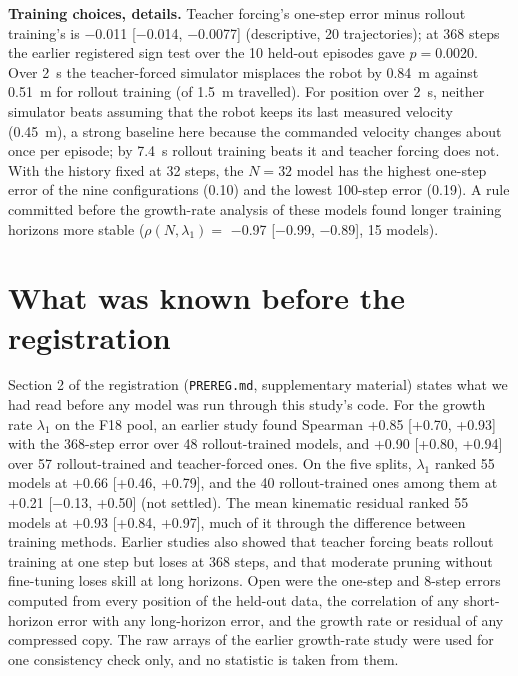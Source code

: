 \textbf{Training choices, details.} Teacher forcing's one-step error minus rollout training's is $-$0.011
[$-$0.014, $-$0.0077] (descriptive, 20 trajectories); at 368 steps the earlier registered sign test over the
10 held-out episodes gave $p={}$0.0020. Over 2~s the teacher-forced simulator misplaces the robot by
0.84~m against 0.51~m for rollout training (of 1.5~m travelled). For position over
2~s, neither simulator beats assuming that the robot keeps its last measured velocity (0.45~m), a
strong baseline here because the commanded velocity changes about once per episode; by 7.4~s rollout training beats it
and teacher forcing does not. With the history fixed at 32 steps, the $N=32$ model has the highest one-step error of
the nine configurations (0.10) and the lowest 100-step error (0.19). A rule committed before the
growth-rate analysis of these models found longer training horizons more stable ($\rho(N,\lambda_1)=$ $-$0.97
[$-$0.99, $-$0.89], 15 models).

\FloatBarrier
\section{What was known before the registration}\label{app:A2}
Section 2 of the registration (\texttt{PREREG.md}, supplementary material) states what we had read before any model was run through this study's code.
For the growth rate $\lambda_1$ on the F18 pool, an earlier study found Spearman +0.85 [+0.70, +0.93]
with the 368-step error over 48 rollout-trained models, and +0.90 [+0.80, +0.94] over
57 rollout-trained and teacher-forced ones. On the five splits, $\lambda_1$ ranked 55 models at
+0.66 [+0.46, +0.79], and the 40 rollout-trained ones among them at
+0.21 [$-$0.13, +0.50] (not settled). The mean kinematic residual ranked 55 models at
+0.93 [+0.84, +0.97], much of it through the difference between training methods. Earlier studies also
showed that teacher forcing beats rollout training at one step but loses at 368 steps, and that moderate pruning
without fine-tuning loses skill at long horizons.
Open were the one-step and 8-step errors computed from every position of the held-out data, the correlation of any
short-horizon error with any long-horizon error, and the growth rate or residual of any compressed copy. The raw
arrays of the earlier growth-rate study were used for one consistency check only, and no statistic is taken from them.

\FloatBarrier
